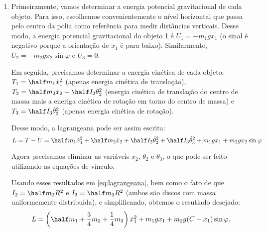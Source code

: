 \begin{question}
	\begin{solution}
		\begin{enumerate}
			\item Primeiramente, vamos determinar a energia potencial gravitacional de cada objeto.
			Para isso, escolhemos convenientemente o nível horizontal que passa pelo centro da polia como referência para medir distâncias verticais.
			Desse modo, a energia potencial gravitacional do objeto 1 é $U_1 = -m_1gx_1$ (o sinal é negativo porque a orientação de $x_1$ é para baixo).
			Similarmente, $U_2 = -m_2gx_2\sin\varphi$ e $U_3 = 0$.

			Em seguida, precisamos determinar a energia cinética de cada objeto: $T_1 = \half m_1 \dot x_1^2$ (apenas energia cinética de translação), $T_2 = \half m_2 \dot x_2 + \half I_2 \dot\theta_2^2$ (energia cinética de translação do centro de massa mais a eneriga cinética de rotação em torno do centro de massa) e $T_3 = \half I_3 \dot\theta_3^2$ (apenas energia cinética de rotação).

			Desse modo, a lagrangeana pode ser assim escrita:
			\begin{equation}\label{eq:lagrangeana}
				L = T - U = \half m_1 \dot x_1^2 + \half m_2 \dot x_2 + \half I_2 \dot\theta_2^2 + \half I_3 \dot\theta_3^2 + m_1gx_1 + m_2gx_2\sin\varphi
			\end{equation}

			Agora precisamos eliminar as variáveis $x_2$, $\theta_2$ e $\theta_3$, o que pode ser feito utilizando as equações de vínculo.

			Usando esses resultados em \eqref{eq:lagrangeana}, bem como o fato de que $I_2 = \half m_2 R^2$ e $I_3 = \half m_3 R^2$ (ambos são discos com massa uniformemente distribuída), e simplificando, obtemos o resutlado desejado:
			\begin{equation*}
				L = \left(\half m_1 + \frac{3}{4}m_2 + \frac{1}{4}m_3\right)\dot x_1^2 + m_1 g x_1 + m_2 g (C - x_1) \sin\varphi.
			\end{equation*}


\end{enumerate}
\end{solution}
\end{question}
